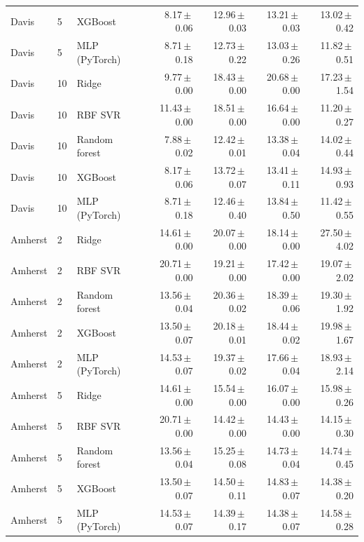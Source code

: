 \documentclass[11pt,letterpaper]{article}
\begin{document}
{\begin{longtable}{@{}llp{2.35cm}rrrr@{}}
Davis & 5 & XGBoost & 8.17\,$\pm$\,0.06 & 12.96\,$\pm$\,0.03 & 13.21\,$\pm$\,0.03 & 13.02\,$\pm$\,0.42 \\
Davis & 5 & MLP (PyTorch) & 8.71\,$\pm$\,0.18 & 12.73\,$\pm$\,0.22 & 13.03\,$\pm$\,0.26 & 11.82\,$\pm$\,0.51 \\
\addlinespace[2pt]
Davis & 10 & Ridge & 9.77\,$\pm$\,0.00 & 18.43\,$\pm$\,0.00 & 20.68\,$\pm$\,0.00 & 17.23\,$\pm$\,1.54 \\
Davis & 10 & RBF SVR & 11.43\,$\pm$\,0.00 & 18.51\,$\pm$\,0.00 & 16.64\,$\pm$\,0.00 & 11.20\,$\pm$\,0.27 \\
Davis & 10 & Random forest & 7.88\,$\pm$\,0.02 & 12.42\,$\pm$\,0.01 & 13.38\,$\pm$\,0.04 & 14.02\,$\pm$\,0.44 \\
Davis & 10 & XGBoost & 8.17\,$\pm$\,0.06 & 13.72\,$\pm$\,0.07 & 13.41\,$\pm$\,0.11 & 14.93\,$\pm$\,0.93 \\
Davis & 10 & MLP (PyTorch) & 8.71\,$\pm$\,0.18 & 12.46\,$\pm$\,0.40 & 13.84\,$\pm$\,0.50 & 11.42\,$\pm$\,0.55 \\
\addlinespace[2pt]
Amherst & 2 & Ridge & 14.61\,$\pm$\,0.00 & 20.07\,$\pm$\,0.00 & 18.14\,$\pm$\,0.00 & 27.50\,$\pm$\,4.02 \\
Amherst & 2 & RBF SVR & 20.71\,$\pm$\,0.00 & 19.21\,$\pm$\,0.00 & 17.42\,$\pm$\,0.00 & 19.07\,$\pm$\,2.02 \\
Amherst & 2 & Random forest & 13.56\,$\pm$\,0.04 & 20.36\,$\pm$\,0.02 & 18.39\,$\pm$\,0.06 & 19.30\,$\pm$\,1.92 \\
Amherst & 2 & XGBoost & 13.50\,$\pm$\,0.07 & 20.18\,$\pm$\,0.01 & 18.44\,$\pm$\,0.02 & 19.98\,$\pm$\,1.67 \\
Amherst & 2 & MLP (PyTorch) & 14.53\,$\pm$\,0.07 & 19.37\,$\pm$\,0.02 & 17.66\,$\pm$\,0.04 & 18.93\,$\pm$\,2.14 \\
\addlinespace[2pt]
Amherst & 5 & Ridge & 14.61\,$\pm$\,0.00 & 15.54\,$\pm$\,0.00 & 16.07\,$\pm$\,0.00 & 15.98\,$\pm$\,0.26 \\
Amherst & 5 & RBF SVR & 20.71\,$\pm$\,0.00 & 14.42\,$\pm$\,0.00 & 14.43\,$\pm$\,0.00 & 14.15\,$\pm$\,0.30 \\
Amherst & 5 & Random forest & 13.56\,$\pm$\,0.04 & 15.25\,$\pm$\,0.08 & 14.73\,$\pm$\,0.04 & 14.74\,$\pm$\,0.45 \\
Amherst & 5 & XGBoost & 13.50\,$\pm$\,0.07 & 14.50\,$\pm$\,0.11 & 14.83\,$\pm$\,0.07 & 14.38\,$\pm$\,0.20 \\
Amherst & 5 & MLP (PyTorch) & 14.53\,$\pm$\,0.07 & 14.39\,$\pm$\,0.17 & 14.38\,$\pm$\,0.07 & 14.58\,$\pm$\,0.28 \\

\end{longtable}}
\end{document}
